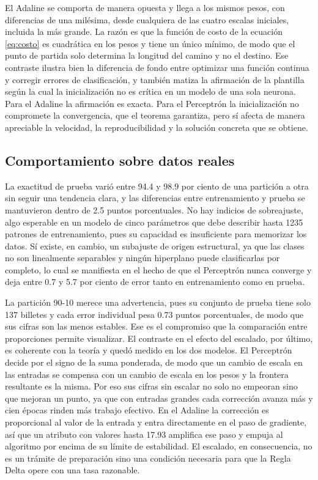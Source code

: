 \documentclass[11pt,letterpaper]{article}
\begin{document}
El Adaline se comporta de manera opuesta y llega a los mismos pesos, con diferencias de una milésima, desde cualquiera de las cuatro escalas iniciales, incluida la más grande. La razón es que la función de costo de la ecuación \eqref{eq:costo} es cuadrática en los pesos y tiene un único mínimo, de modo que el punto de partida solo determina la longitud del camino y no el destino. Ese contraste ilustra bien la diferencia de fondo entre optimizar una función continua y corregir errores de clasificación, y también matiza la afirmación de la plantilla según la cual la inicialización no es crítica en un modelo de una sola neurona. Para el Adaline la afirmación es exacta. Para el Perceptrón la inicialización no compromete la convergencia, que el teorema garantiza, pero sí afecta de manera apreciable la velocidad, la reproducibilidad y la solución concreta que se obtiene.

\subsection{Comportamiento sobre datos reales}

La exactitud de prueba varió entre 94.4 y 98.9 por ciento de una partición a otra sin seguir una tendencia clara, y las diferencias entre entrenamiento y prueba se mantuvieron dentro de 2.5 puntos porcentuales. No hay indicios de sobreajuste, algo esperable en un modelo de cinco parámetros que debe describir hasta 1235 patrones de entrenamiento, pues su capacidad es insuficiente para memorizar los datos. Sí existe, en cambio, un subajuste de origen estructural, ya que las clases no son linealmente separables y ningún hiperplano puede clasificarlas por completo, lo cual se manifiesta en el hecho de que el Perceptrón nunca converge y deja entre 0.7 y 5.7 por ciento de error tanto en entrenamiento como en prueba.

La partición 90-10 merece una advertencia, pues su conjunto de prueba tiene solo 137 billetes y cada error individual pesa 0.73 puntos porcentuales, de modo que sus cifras son las menos estables. Ese es el compromiso que la comparación entre proporciones permite visualizar. El contraste en el efecto del escalado, por último, es coherente con la teoría y quedó medido en los dos modelos. El Perceptrón decide por el signo de la suma ponderada, de modo que un cambio de escala en las entradas se compensa con un cambio de escala en los pesos y la frontera resultante es la misma. Por eso sus cifras sin escalar no solo no empeoran sino que mejoran un punto, ya que con entradas grandes cada corrección avanza más y cien épocas rinden más trabajo efectivo. En el Adaline la corrección es proporcional al valor de la entrada y entra directamente en el paso de gradiente, así que un atributo con valores hasta 17.93 amplifica ese paso y empuja al algoritmo por encima de su límite de estabilidad. El escalado, en consecuencia, no es un trámite de preparación sino una condición necesaria para que la Regla Delta opere con una tasa razonable.
\end{document}
